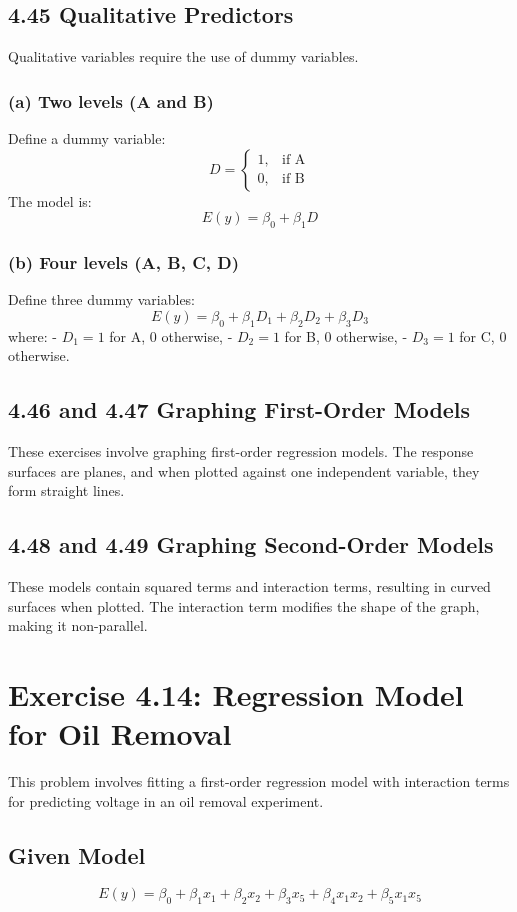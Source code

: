 \documentclass{article}
\begin{document}
\subsection{4.45 Qualitative Predictors}
Qualitative variables require the use of dummy variables.

\subsubsection{(a) Two levels (A and B)}
Define a dummy variable:
\[
D = \begin{cases} 
    1, & \text{if A} \\
    0, & \text{if B}
\end{cases}
\]
The model is:
\[
E(y) = \beta_0 + \beta_1 D
\]

\subsubsection{(b) Four levels (A, B, C, D)}
Define three dummy variables:
\[
E(y) = \beta_0 + \beta_1 D_1 + \beta_2 D_2 + \beta_3 D_3
\]
where:
- \( D_1 = 1 \) for A, 0 otherwise,
- \( D_2 = 1 \) for B, 0 otherwise,
- \( D_3 = 1 \) for C, 0 otherwise.

\subsection{4.46 and 4.47 Graphing First-Order Models}
These exercises involve graphing first-order regression models. The response surfaces are planes, and when plotted against one independent variable, they form straight lines.

\subsection{4.48 and 4.49 Graphing Second-Order Models}
These models contain squared terms and interaction terms, resulting in curved surfaces when plotted. The interaction term modifies the shape of the graph, making it non-parallel.

\section{Exercise 4.14: Regression Model for Oil Removal}
This problem involves fitting a first-order regression model with interaction terms for predicting voltage in an oil removal experiment.

\subsection{Given Model}
\[
E(y) = \beta_0 + \beta_1 x_1 + \beta_2 x_2 + \beta_3 x_5 + \beta_4 x_1 x_2 + \beta_5 x_1 x_5
\]
\end{document}

